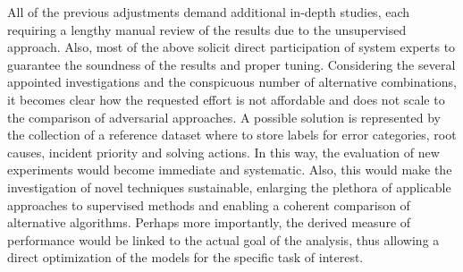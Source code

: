 All of the previous adjustments demand additional in-depth studies, each requiring a lengthy manual review of the results due to the unsupervised approach.
Also, most of the above solicit direct participation of system experts to guarantee the soundness of the results and proper tuning.
Considering the several appointed investigations and the conspicuous number of alternative combinations, it becomes clear how the requested effort is not affordable and does not scale to the comparison of adversarial approaches.
A possible solution is represented by the collection of a reference dataset where to store labels for error categories, root causes, incident priority and solving actions. 
In this way, the evaluation of new experiments would become immediate and systematic.
Also, this would make the investigation of novel techniques sustainable, enlarging the plethora of applicable approaches to supervised methods and enabling a coherent comparison of alternative algorithms.
Perhaps more importantly, the derived measure of performance would be linked to the actual goal of the analysis, thus allowing a direct optimization of the models for the specific task of interest.






